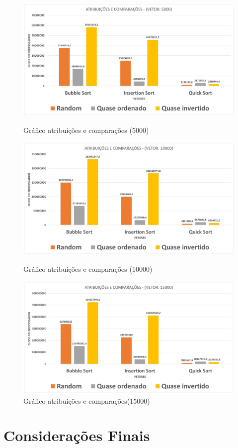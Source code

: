 \documentclass[12pt]{article}
\begin{document}
\begin{figure}[!htb]
     \centering
     \includegraphics[width=15cm, height=6cm]{graficos/grafico_atribuicoes5-1.jpg}
     \caption{Gráfico atribuições e comparações (5000)}
     \label{A5}

     \centering
     \includegraphics[width=15cm, height=6cm]{graficos/grafico_atribuicoes10-1.jpg}
     \caption{Gráfico atribuições e comparações (10000)}
     \label{A10}

     \centering
     \includegraphics[width=15cm, height=6cm]{graficos/grafico_atribuicoes15-1.jpg}
     \caption{Gráfico atribuições e comparações(15000)}
     \label{A15}
\end{figure}

\newpage 
\section{Considerações Finais}
\end{document}

